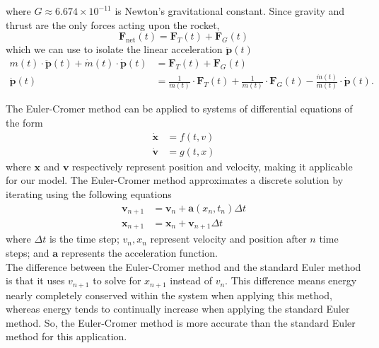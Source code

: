 \documentclass{article}
\begin{document}
where $G \approx 6.674 \times 10^{-11}$ is Newton's gravitational constant. Since gravity and thrust are the only forces acting upon the rocket,
\[
\bm{F}_\text{net}(t) = \bm{F}_T(t) + \bm{F}_G(t)
\]
which we can use to isolate the linear acceleration $\ddot{\bm{p}}(t)$
\begin{align*}
m(t) \cdot \ddot{\bm{p}}(t) + \dot{m}(t) \cdot \dot{\bm{p}}(t) &= \bm{F}_T(t) + \bm{F}_G(t) \\
\ddot{\bm{p}}(t) &= \frac{1}{m(t)} \cdot \bm{F}_T(t) + \frac{1}{m(t)} \cdot \bm{F}_G(t) - \frac{\dot{m}(t)}{m(t)} \cdot \dot{\bm{p}}(t).
\end{align*}


The Euler-Cromer method can be applied to systems of differential equations of the form
\begin{align*}
    \bm{\dot{x}} &= f(t, v) \\
    \bm{\dot{v}} &= g(t, x)
\end{align*}
where $\bm{x}$ and $\bm{v}$ respectively represent position and velocity, making it applicable for our model. The Euler-Cromer method approximates a discrete solution by iterating using the following equations
\begin{align*}
    \bm{v}_{n+1} &= \bm{v}_n + \bm{a}(x_n, t_n)\Delta t \\
    \bm{x}_{n+1} &= \bm{x}_{n} + \bm{v}_{n+1}\Delta t
\end{align*}
where $\Delta t$ is the time step; $v_n, x_n$ represent velocity and position after $n$ time steps; and $\bm{a}$ represents the acceleration function. \\

The difference between the Euler-Cromer method and the standard Euler method is that it uses $v_{n+1}$ to solve for $x_{n+1}$ instead of $v_n$. This difference means energy nearly completely conserved within the system when applying this method, whereas energy tends to continually increase when applying the standard Euler method.\cite{euler} So, the Euler-Cromer method is more accurate than the standard Euler method for this application. \\
\end{document}
